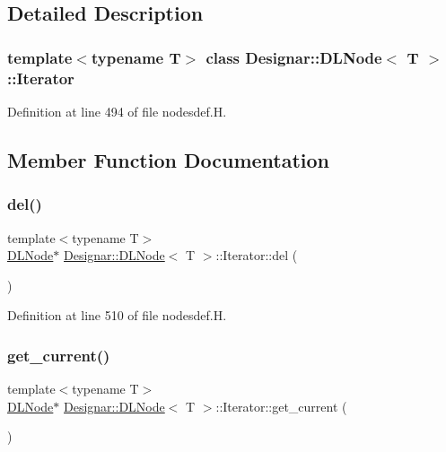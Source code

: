 \subsection{Detailed Description}
\subsubsection*{template$<$typename T$>$\newline
class Designar\+::\+D\+L\+Node$<$ T $>$\+::\+Iterator}



Definition at line 494 of file nodesdef.\+H.



\subsection{Member Function Documentation}
\mbox{\label{class_designar_1_1_d_l_node_1_1_iterator_a7ba9818dbd9d8cbbd85fe47db3395375}} 
\subsubsection{\texorpdfstring{del()}{del()}}
{\footnotesize\ttfamily template$<$typename T$>$ \\
\hyperlink{class_designar_1_1_d_l_node}{D\+L\+Node}$\ast$ \hyperlink{class_designar_1_1_d_l_node}{Designar\+::\+D\+L\+Node}$<$ T $>$\+::Iterator\+::del (\begin{DoxyParamCaption}{ }\end{DoxyParamCaption})\hspace{0.3cm}{\ttfamily [inline]}}



Definition at line 510 of file nodesdef.\+H.

\mbox{\label{class_designar_1_1_d_l_node_1_1_iterator_a5787051e4f6727efef70ac3f8991ab59}} 
\subsubsection{\texorpdfstring{get\+\_\+current()}{get\_current()}\hspace{0.1cm}{\footnotesize\ttfamily [1/2]}}
{\footnotesize\ttfamily template$<$typename T$>$ \\
\hyperlink{class_designar_1_1_d_l_node}{D\+L\+Node}$\ast$ \hyperlink{class_designar_1_1_d_l_node}{Designar\+::\+D\+L\+Node}$<$ T $>$\+::Iterator\+::get\+\_\+current (\begin{DoxyParamCaption}{ }\end{DoxyParamCaption})\hspace{0.3cm}{\ttfamily [inline]}}



